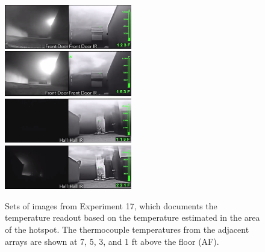 \documentclass[12pt,oneside]{book}
\begin{document}
\begin{figure}[H]
\centering
\includegraphics[width=0.495\textwidth]{../0_Images/Tactical_Considerations/Thermal_Imager/Exp17FD_7min.png}
\includegraphics[width=0.495\textwidth]{../0_Images/Tactical_Considerations/Thermal_Imager/Exp17FD_8_9min.png}
\includegraphics[width=0.495\textwidth]{../0_Images/Tactical_Considerations/Thermal_Imager/Exp17Hall_7min.png}
\includegraphics[width=0.495\textwidth]{../0_Images/Tactical_Considerations/Thermal_Imager/Exp17Hall_8_9min.png}
\caption[Thermal Imager I]{Sets of images from Experiment 17, which documents the temperature readout based on the temperature estimated in the area of the hotspot. The thermocouple temperatures from the adjacent arrays are shown at 7, 5, 3, and 1 ft above the floor (AF).}
\label{fig:thermal_imager_i}
\end{figure}
\end{document}
